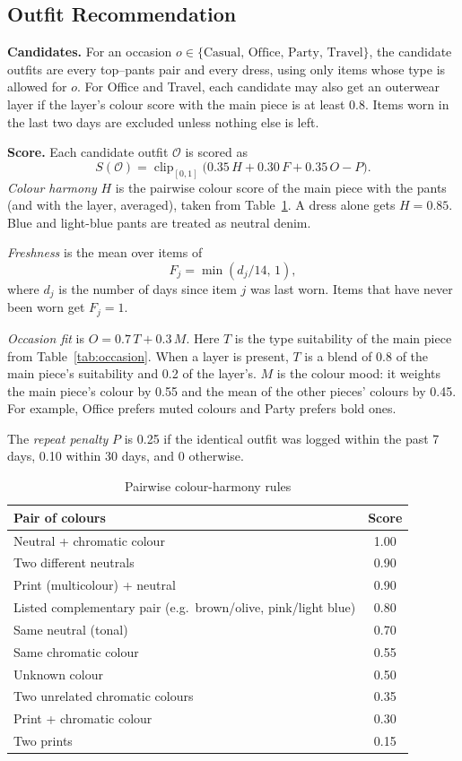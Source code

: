 \documentclass[conference]{IEEEtran}
\begin{document}
\subsection{Outfit Recommendation}\label{sec:rec}
\textbf{Candidates.} For an occasion $o\in\{\text{Casual, Office, Party, Travel}\}$, the candidate outfits are every top--pants pair and every dress, using only items whose type is allowed for $o$. For Office and Travel, each candidate may also get an outerwear layer if the layer's colour score with the main piece is at least 0.8. Items worn in the last two days are excluded unless nothing else is left.

\textbf{Score.} Each candidate outfit $\mathcal{O}$ is scored as
\begin{equation}
  S(\mathcal{O}) = \operatorname{clip}_{[0,1]}\big(0.35\,H + 0.30\,F + 0.35\,O - P\big).
  \label{eq:score}
\end{equation}
\emph{Colour harmony} $H$ is the pairwise colour score of the main piece with the pants (and with the layer, averaged), taken from Table~\ref{tab:harmony}. A dress alone gets $H=0.85$. Blue and light-blue pants are treated as neutral denim.

\emph{Freshness} is the mean over items of
\begin{equation}
  F_j = \min(d_j/14,\,1),
\end{equation}
where $d_j$ is the number of days since item $j$ was last worn. Items that have never been worn get $F_j=1$.

\emph{Occasion fit} is $O = 0.7\,T + 0.3\,M$. Here $T$ is the type suitability of the main piece from Table~\ref{tab:occasion}. When a layer is present, $T$ is a blend of 0.8 of the main piece's suitability and 0.2 of the layer's. $M$ is the colour mood: it weights the main piece's colour by 0.55 and the mean of the other pieces' colours by 0.45. For example, Office prefers muted colours and Party prefers bold ones.

The \emph{repeat penalty} $P$ is 0.25 if the identical outfit was logged within the past 7 days, 0.10 within 30 days, and 0 otherwise.

\begin{table}[t]
\caption{Pairwise colour-harmony rules}
\label{tab:harmony}
\centering
\begin{tabular}{lc}
\toprule
Pair of colours & Score \\
\midrule
Neutral + chromatic colour & 1.00 \\
Two different neutrals & 0.90 \\
Print (multicolour) + neutral & 0.90 \\
Listed complementary pair (e.g.\ brown/olive, pink/light blue) & 0.80 \\
Same neutral (tonal) & 0.70 \\
Same chromatic colour & 0.55 \\
Unknown colour & 0.50 \\
Two unrelated chromatic colours & 0.35 \\
Print + chromatic colour & 0.30 \\
Two prints & 0.15 \\
\bottomrule
\end{tabular}
\end{table}
\end{document}
